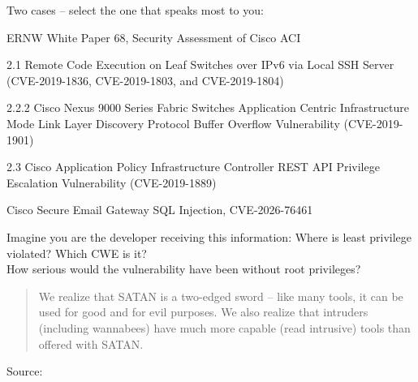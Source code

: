 \documentclass[Screen16to9,17pt]{foils}
\begin{document}

Two cases -- select the one that speaks most to you:
\begin{list1}
\item ERNW White Paper 68, Security Assessment of Cisco ACI\\{\footnotesize
{}}
\begin{list2}
\item 2.1 Remote Code Execution on Leaf Switches over IPv6 via Local SSH Server (CVE-2019-1836, CVE-2019-1803, and CVE-2019-1804)
\item 2.2.2 Cisco Nexus 9000 Series Fabric Switches Application Centric Infrastructure Mode Link Layer
Discovery Protocol Buffer Overflow Vulnerability (CVE-2019-1901)
\item 2.3 Cisco Application Policy Infrastructure Controller REST API Privilege Escalation Vulnerability (CVE-2019-1889)
\end{list2}
\item Cisco Secure Email Gateway SQL Injection, CVE-2026-76461\\{\footnotesize
{}}
\end{list1}

Imagine you are the developer receiving this information:
Where is least privilege violated? Which CWE is it? \\
How serious would the vulnerability have been without root privileges?


\breakdance





\begin{quote}
We realize that SATAN is a two-edged sword -- like
many tools, it can be used for good and for evil
purposes. We also realize that intruders (including
wannabees) have much more capable (read intrusive)
tools than offered with SATAN.
\end{quote}
Source:
\end{document}
